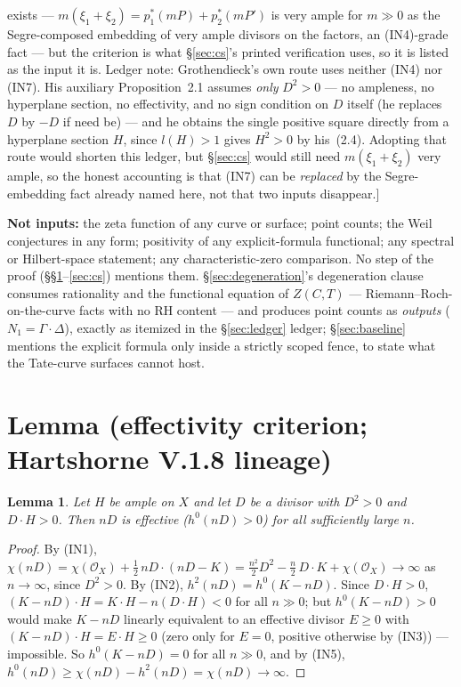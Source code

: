 \documentclass[11pt]{article}
\newtheorem{lemma}[theorem]{Lemma}
\theoremstyle{definition}
\theoremstyle{remark}
\newcommand{\OX}{\mathcal{O}_X}
\begin{document}
\begin{itemize}
  exists --- $m(\xi_1 + \xi_2) = p_1^*(mP) + p_2^*(mP')$ is very ample for $m \gg 0$ as the
  Segre-composed embedding of very ample divisors on the factors, an (IN4)-grade fact ---
  but the criterion is what \S\ref{sec:cs}'s printed verification uses, so it is listed as
  the input it is. Ledger note: Grothendieck's own route \cite[\S2]{Grothendieck} uses neither
  (IN4) nor (IN7). His auxiliary Proposition~2.1 assumes \emph{only} $D^2 > 0$ --- no
  ampleness, no hyperplane section, no effectivity, and no sign condition on $D$ itself (he
  replaces $D$ by $-D$ if need be) --- and he obtains the single positive square directly from a
  hyperplane section $H$, since $l(H) > 1$ gives $H^2 > 0$ by his~(2.4). Adopting that route
  would shorten this ledger, but \S\ref{sec:cs} would still need $m(\xi_1 + \xi_2)$ very
  ample, so the honest accounting is that (IN7) can be \emph{replaced} by the Segre-embedding
  fact already named here, not that two inputs disappear.]
\end{itemize}

\textbf{Not inputs:} the zeta function of any curve or surface; point counts; the Weil
conjectures in any form; positivity of any explicit-formula functional; any spectral or
Hilbert-space statement; any characteristic-zero comparison. No step of the proof
(\S\S\ref{sec:lemma}--\ref{sec:cs}) mentions them. \S\ref{sec:degeneration}'s degeneration
clause consumes rationality and the functional equation of $Z(C, T)$ ---
Riemann--Roch-on-the-curve facts with no RH content --- and produces point counts as
\emph{outputs} ($N_1 = \Gamma \cdot \Delta$), exactly as itemized in the
\S\ref{sec:ledger} ledger; \S\ref{sec:baseline} mentions the explicit formula only inside a
strictly scoped fence, to state what the Tate-curve surfaces cannot host.

\section{Lemma (effectivity criterion; Hartshorne V.1.8 lineage)}
\label{sec:lemma}

\begin{lemma}
\label{lem:effectivity}
Let $H$ be ample on $X$ and let $D$ be a divisor with $D^2 > 0$ and $D \cdot H > 0$. Then
$nD$ is effective ($h^0(nD) > 0$) for all sufficiently large $n$.
\end{lemma}

\begin{proof}
By (IN1),
$\chi(nD) = \chi(\OX) + \tfrac{1}{2}\, nD \cdot (nD - K)
= \tfrac{n^2}{2} D^2 - \tfrac{n}{2}\, D \cdot K + \chi(\OX) \to \infty$
as $n \to \infty$, since $D^2 > 0$. By (IN2), $h^2(nD) = h^0(K - nD)$. Since
$D \cdot H > 0$, $(K - nD) \cdot H = K \cdot H - n (D \cdot H) < 0$ for all $n \gg 0$; but
$h^0(K - nD) > 0$ would make $K - nD$ linearly equivalent to an effective divisor $E \ge 0$
with $(K - nD) \cdot H = E \cdot H \ge 0$ (zero only for $E = 0$, positive otherwise by
(IN3)) --- impossible. So $h^0(K - nD) = 0$ for all $n \gg 0$, and by (IN5),
$h^0(nD) \ge \chi(nD) - h^2(nD) = \chi(nD) \to \infty$.
\end{proof}
\end{document}
